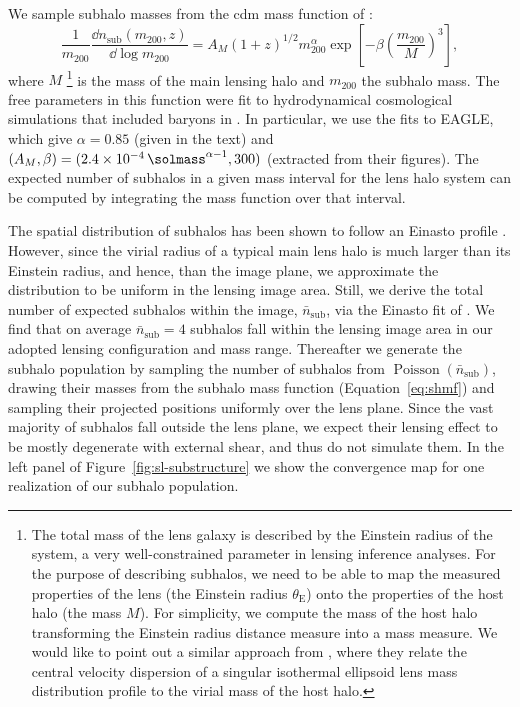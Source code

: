 We sample subhalo masses from the \gls*{cdm} mass function of \cite{Giocoli:2009ie}:
\begin{equation} \label{eq:shmf}
    \frac{1}{m_\mathrm{200}}\frac{\dd n_\mathrm{sub}( m_\mathrm{200}, z)}{\dd\log m_\mathrm{200}} = A_M (1+z)^{1/2}m_{200}^{\alpha} \exp\left[-\beta\left(\frac{m_\mathrm{200}}{M}\right)^3 \right],
\end{equation}
where $M$ \footnote{
    The total mass of the lens galaxy is described by the Einstein radius of the system, a very well-constrained parameter in lensing inference analyses. For the purpose of describing subhalos, we need to be able to map the measured properties of the lens (the Einstein radius $\theta_\mathrm{E}$) onto the properties of the host halo (the mass $M$). For simplicity, we compute the mass of the host halo transforming the Einstein radius distance measure into a mass measure. We would like to point out a similar approach from \cite{Brehmer:2019jyt}, where they relate the central velocity dispersion of a singular isothermal ellipsoid lens mass distribution profile to the virial mass of the host halo.
}  is the mass of the main lensing halo and $m_\mathrm{200}$ the subhalo mass. The free parameters in this function were fit to hydrodynamical cosmological simulations that included baryons in \cite{Despali:2016meh}. In particular, we use the fits to EAGLE, which give $\alpha = 0.85$ (given in the text) and $(A_M, \beta) = (2.4\times10^{-4}\, \si{\solmass}^{\alpha - 1}, 300)$ (extracted from their figures). The expected number of subhalos in a given mass interval for the lens halo system can be computed by integrating the mass function over that interval.

The spatial distribution of subhalos has been shown to follow an Einasto profile \citep{Springel:2008cc}. However, since the virial radius of a typical main lens halo is much larger than its Einstein radius, and hence, than the image plane, we approximate the distribution to be uniform in the lensing image area. Still, we derive the total number of expected subhalos within the image,  $\bar{n}_\mathrm{sub}$,  via the Einasto fit of \cite{Despali:2016meh}. We find that on average $\bar{n}_\mathrm{sub}=4$ subhalos fall within the lensing image area in our adopted lensing configuration and mass range. %
Thereafter we generate the subhalo population by sampling the number of subhalos from $\operatorname{Poisson}(\bar{n}_\mathrm{sub})$, drawing their masses from the subhalo mass function (Equation~\eqref{eq:shmf}) and sampling their projected positions uniformly over the lens plane. Since the vast majority of subhalos fall outside the lens plane, we expect their lensing effect to be mostly degenerate with external shear, and thus do not simulate them. In the left panel of Figure~\ref{fig:sl-substructure} we show the convergence map for one realization of our subhalo population.

